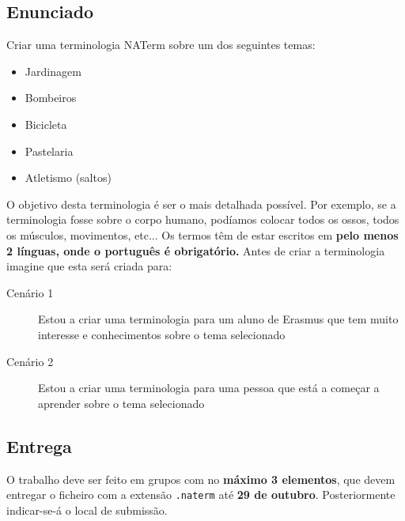 \documentclass[10pt,a4paper,notitlepage]{article}
\begin{document}
\subsection*{Enunciado}
Criar uma terminologia NATerm sobre um dos seguintes temas:
\begin{itemize}
    \item Jardinagem
    \item Bombeiros
    \item Bicicleta
    \item Pastelaria
    \item Atletismo (saltos)
\end{itemize}
O objetivo desta terminologia é ser o mais detalhada possível. Por exemplo, se a terminologia fosse sobre o corpo humano, podíamos colocar todos os ossos, todos os músculos, movimentos, etc... Os termos têm de estar escritos em \textbf{pelo menos 2 línguas, onde o português é obrigatório.}
Antes de criar a terminologia imagine que esta será criada para:
\begin{description}
    \item[Cenário 1] Estou a criar uma terminologia para um aluno de Erasmus que tem muito interesse e conhecimentos sobre o tema selecionado
    \item[Cenário 2] Estou a criar uma terminologia para uma pessoa que está a começar a aprender sobre o tema selecionado 
\end{description}

\subsection*{Entrega}
O trabalho deve ser feito em grupos com no \textbf{máximo 3 elementos}, que devem entregar o ficheiro com a extensão \texttt{.naterm} até \textbf{29 de outubro}. Posteriormente indicar-se-á o local de submissão.
\end{document}

